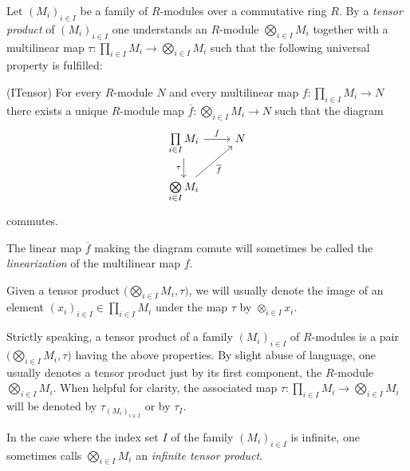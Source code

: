 \begin{definition}
  Let $(M_i)_{i\in I}$ be a family of $R$-modules over a commutative ring $R$. By a
  \emph{tensor product} of  $(M_i)_{i\in I}$ one understands an $R$-module $\bigotimes_{i\in I}M_i$
  together with a multilinear map
  $\tau : \prod_{i\in I}M_i \to \bigotimes_{i\in I}M_i$ such that the following universal property is fulfilled:
  \begin{axiomlist}[\hspace{2.5em}]
  \item[\textup{\sffamily (ITensor)}]
   \label{axiom:hilbert-tensor-product}
   For every $R$-module $N$ and every multilinear map 
   $f : \prod_{i\in I}M_i \to N$ there exists a unique $R$-module map
   $\overline{f}: \bigotimes_{i\in I}M_i \to N$ 
   such that the diagram 
   \begin{displaymath}
   \begin{tikzcd}
       \prod\limits_{i\in I}M_i  \ar[d,"\tau",swap] \ar[r,"f"]  & N \\
       \bigotimes\limits_{i\in I}M_i \ar[ru,"\overline{f}",swap]
   \end{tikzcd}
   \end{displaymath}
   commutes.
 \end{axiomlist} 

 The linear map $\overline{f}$ making the diagram comute will sometimes be called the \emph{linearization}
 of the multilinear map $f$.
   
 Given a tensor product
 $\big( \bigotimes_{i\in I}M_i,\tau\big)$, we will usually denote the image of an element 
 $(x_i)_{i\in I} \in \prod_{i\in I}M_i$
 under the map $\tau$ by $\otimes_{i\in I} x_i$. 
\end{definition}

\begin{remarks}
  \begin{environmentlist}
  \item
    Strictly speaking, a tensor product of a family $(M_i)_{i\in I}$ of $R$-modules is a pair
    $\big( \bigotimes_{i\in I}M_i,\tau\big)$ having the above properties. By slight abuse of language, one
    usually denotes a tensor product just by its first component, the $R$-module $\bigotimes_{i\in I}M_i$.
    When helpful for clarity, the associated map $\tau: \prod_{i\in I}M_i \to \bigotimes_{i\in I}M_i$
    will be denoted by $\tau_{(M_i)_{i\in I}}$ or by $\tau_I$. 
  \item   
    In the case where the index set $I$  of the family $(M_i)_{i\in I}$ is infinite, one
    sometimes calls $\bigotimes_{i\in I}M_i$ an \emph{infinite tensor product}. 
  \end{environmentlist}
\end{remarks}



